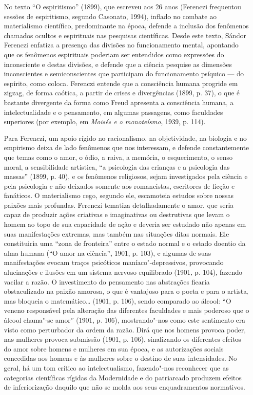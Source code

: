 No texto ``O espiritismo'' (1899), que escreveu aos 26 anos (Ferenczi
frequentou sessões de espiritismo, segundo Casonato, 1994), inflado no
combate ao materialismo científico, predominante na época, defende a
inclusão dos fenômenos chamados ocultos e espirituais nas pesquisas
científicas. Desde este texto, Sándor Ferenczi enfatiza a presença das
divisões no funcionamento mental, apontando que os fenômenos espirituais
poderiam ser entendidos como expressões do inconsciente e destas
divisões, e defende que a ciência pesquise as dimensões inconscientes e
semiconscientes que participam do funcionamento psíquico --- do espírito,
como coloca. Ferenczi entende que a consciência humana progride em
zigzag, de forma caótica, a partir de crises e divergências (1899, p.
37), o que é bastante divergente da forma como Freud apresenta a
consciência humana, a intelectualidade e o pensamento, em algumas
passagens, como faculdades superiores (por exemplo, em \emph{Moisés e o
monoteísmo}, 1939, p. 114).

Para Ferenczi, um apoio rígido no racionalismo, na objetividade, na
biologia e no empirismo deixa de lado fenômenos que nos interessam, e
defende constantemente que temas como o amor, o ódio, a raiva, a
memória, o esquecimento, o senso moral, a sensibilidade artística, ``a
psicologia das crianças e a psicologia das massas'' (1899, p. 40), e os fenômenos religiosos, sejam investigados pela ciência
e pela psicologia e não deixados somente aos romancistas, escritores de
ficção e fanáticos. O materialismo cego, segundo ele, escamoteia estudos
sobre nossas paixões mais profundas. Ferenczi tematiza detalhadamente o
amor, que seria capaz de produzir ações criativas e imaginativas ou
destrutivas que levam o homem ao topo de sua capacidade de ação e
deveria ser estudado não apenas em suas manifestações extremas, mas
também nas situações ditas normais. Ele constituiria uma ``zona de
fronteira'' entre o estado normal e o estado doentio da alma humana (``O
amor na ciência'', 1901, p. 103), e algumas de suas manifestações evocam
traços psicóticos maníaco"-depressivos, provocando alucinações e ilusões
em um sistema nervoso equilibrado (1901, p. 104), fazendo vacilar a
razão. O investimento do pensamento nas abstrações ficaria obstaculizado
na paixão amorosa, o que é vantajoso para o poeta e para o artista, mas
bloqueia o matemático\ldots{} (1901, p. 106), sendo comparado ao álcool: ``O
veneno responsável pela alteração das diferentes faculdades e mais
poderoso que o álcool chama"-se amor'' (1901, p. 106), mostrando"-nos como
este sentimento era visto como perturbador da ordem da razão. Dirá que
nos homens provoca poder, nas mulheres provoca submissão (1901, p. 106),
sinalizando os diferentes efeitos do amor sobre homens e mulheres em sua
época, e as autorizações sociais concedidas aos homens e às mulheres
sobre o destino de suas intensidades. No geral, há um tom crítico ao
intelectualismo, fazendo"-nos reconhecer que as categorias científicas
rígidas da Modernidade e do patriarcado produzem efeitos de
inferiorização daquilo que não se molda aos seus enquadramentos
normativos.

